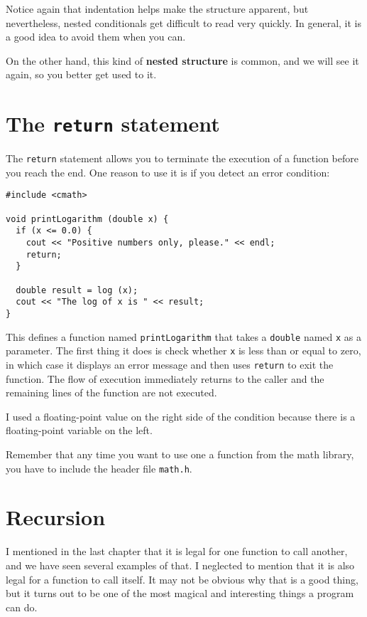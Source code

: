 Notice again that indentation helps make the structure
apparent, but nevertheless, nested conditionals get difficult to read
very quickly.  In general, it is a good idea to avoid them when you
can.


On the other hand, this kind of {\bf nested structure} is common, and
we will see it again, so you better get used to it.

\section{The {\tt return} statement}

The {\tt return} statement allows you to terminate the execution
of a function before you reach the end.  One reason to use it
is if you detect an error condition:

\begin{lstlisting}
#include <cmath>

void printLogarithm (double x) {
  if (x <= 0.0) {
    cout << "Positive numbers only, please." << endl;
    return;
  }

  double result = log (x);
  cout << "The log of x is " << result;
}
\end{lstlisting}
%
This defines a function named {\tt printLogarithm} that takes
a {\tt double} named {\tt x} as a parameter.  The first thing
it does is check whether {\tt x} is less than or equal to
zero, in which case it displays an error message and then uses
{\tt return} to exit the function.  The flow of execution
immediately returns to the caller and the remaining lines of
the function are not executed.

I used a floating-point value on the right side of the condition
because there is a floating-point variable on the left.

Remember that any time you want to use one a function from the math
library, you have to include the header file {\tt math.h}.

\section{Recursion}
\label{recursion}

I mentioned in the last chapter that it is legal for one function to
call another, and we have seen several examples of that.  I neglected
to mention that it is also legal for a function to call itself.  It
may not be obvious why that is a good thing, but it turns out to be
one of the most magical and interesting things a program can do.

